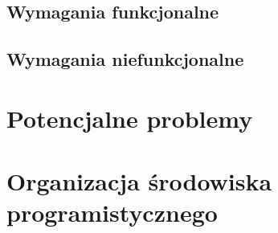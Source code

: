 \subsection[Wymagania funkcjonalne]{Wymagania funkcjonalne}

\subsection[Wymagania niefunkcjonalne]{Wymagania niefunkcjonalne}

\section[Potencjalne problemy]{Potencjalne problemy}

\section[Organizacja środowiska programistycznego]{Organizacja środowiska programistycznego}